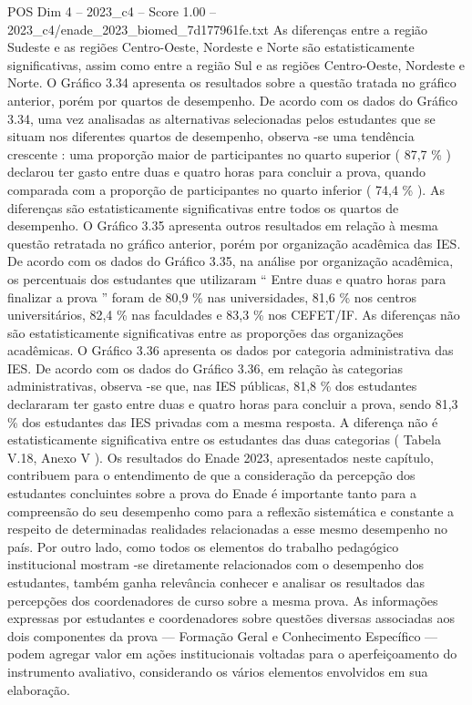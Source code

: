 \begin{textsample}{POS Dim 4 – 2023\_c4 – Score 1.00 – 2023\_c4/enade\_2023\_biomed\_7d177961fe.txt}
As diferenças entre a região Sudeste e as regiões Centro-Oeste, Nordeste e Norte são estatisticamente significativas, assim como entre a região Sul e as regiões Centro-Oeste, Nordeste e Norte.
O Gráfico 3.34 apresenta os resultados sobre a questão tratada no gráfico anterior, porém por quartos de desempenho.
De acordo com os dados do Gráfico 3.34, uma vez analisadas as alternativas selecionadas pelos estudantes que se situam nos diferentes quartos de desempenho, observa -se uma tendência crescente : uma proporção maior de participantes no quarto superior ( 87,7 \% ) declarou ter gasto entre duas e quatro horas para concluir a prova, quando comparada com a proporção de participantes no quarto inferior ( 74,4 \% ).
As diferenças são estatisticamente significativas entre todos os quartos de desempenho.
O Gráfico 3.35 apresenta outros resultados em relação à mesma questão retratada no gráfico anterior, porém por organização acadêmica das IES.
De acordo com os dados do Gráfico 3.35, na análise por organização acadêmica, os percentuais dos estudantes que utilizaram “ Entre duas e quatro horas para finalizar a prova ” foram de 80,9 \% nas universidades, 81,6 \% nos centros universitários, 82,4 \% nas faculdades e 83,3 \% nos CEFET/IF.
As diferenças não são estatisticamente significativas entre as proporções das organizações acadêmicas.
O Gráfico 3.36 apresenta os dados por categoria administrativa das IES.
De acordo com os dados do Gráfico 3.36, em relação às categorias administrativas, observa -se que, nas IES públicas, 81,8 \% dos estudantes declararam ter gasto entre duas e quatro horas para concluir a prova, sendo 81,3 \% dos estudantes das IES privadas com a mesma resposta.
A diferença não é estatisticamente significativa entre os estudantes das duas categorias ( Tabela V.18, Anexo V ).
Os resultados do Enade 2023, apresentados neste capítulo, contribuem para o entendimento de que a consideração da percepção dos estudantes concluintes sobre a prova do Enade é importante tanto para a compreensão do seu desempenho como para a reflexão sistemática e constante a respeito de determinadas realidades relacionadas a esse mesmo desempenho no país.
Por outro lado, como todos os elementos do trabalho pedagógico institucional mostram -se diretamente relacionados com o desempenho dos estudantes, também ganha relevância conhecer e analisar os resultados das percepções dos coordenadores de curso sobre a mesma prova.
As informações expressas por estudantes e coordenadores sobre questões diversas associadas aos dois componentes da prova — Formação Geral e Conhecimento Específico — podem agregar valor em ações institucionais voltadas para o aperfeiçoamento do instrumento avaliativo, considerando os vários elementos envolvidos em sua elaboração.

\end{textsample}
